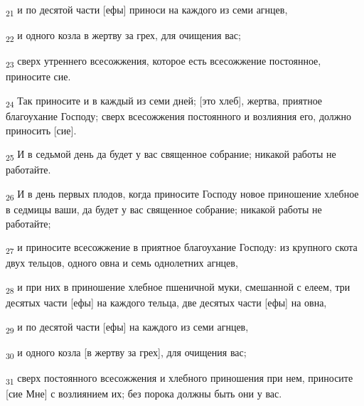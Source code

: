\begin{tcolorbox}
\textsubscript{21} и по десятой части [ефы] приноси на каждого из семи агнцев,
\end{tcolorbox}
\begin{tcolorbox}
\textsubscript{22} и одного козла в жертву за грех, для очищения вас;
\end{tcolorbox}
\begin{tcolorbox}
\textsubscript{23} сверх утреннего всесожжения, которое есть всесожжение постоянное, приносите сие.
\end{tcolorbox}
\begin{tcolorbox}
\textsubscript{24} Так приносите и в каждый из семи дней; [это хлеб], жертва, приятное благоухание Господу; сверх всесожжения постоянного и возлияния его, должно приносить [сие].
\end{tcolorbox}
\begin{tcolorbox}
\textsubscript{25} И в седьмой день да будет у вас священное собрание; никакой работы не работайте.
\end{tcolorbox}
\begin{tcolorbox}
\textsubscript{26} И в день первых плодов, когда приносите Господу новое приношение хлебное в седмицы ваши, да будет у вас священное собрание; никакой работы не работайте;
\end{tcolorbox}
\begin{tcolorbox}
\textsubscript{27} и приносите всесожжение в приятное благоухание Господу: из крупного скота двух тельцов, одного овна и семь однолетних агнцев,
\end{tcolorbox}
\begin{tcolorbox}
\textsubscript{28} и при них в приношение хлебное пшеничной муки, смешанной с елеем, три десятых части [ефы] на каждого тельца, две десятых части [ефы] на овна,
\end{tcolorbox}
\begin{tcolorbox}
\textsubscript{29} и по десятой части [ефы] на каждого из семи агнцев,
\end{tcolorbox}
\begin{tcolorbox}
\textsubscript{30} и одного козла [в жертву за грех], для очищения вас;
\end{tcolorbox}
\begin{tcolorbox}
\textsubscript{31} сверх постоянного всесожжения и хлебного приношения при нем, приносите [сие Мне] с возлиянием их; без порока должны быть они у вас.
\end{tcolorbox}
